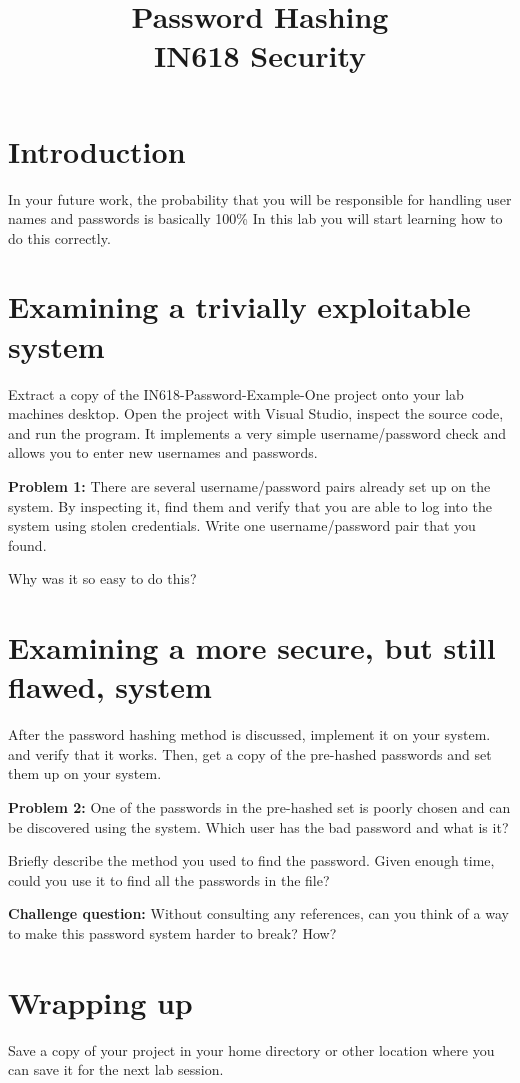 \documentclass{article}
\begin{document}
\title{Password Hashing\\ IN618 Security}
\date{}
\maketitle

\section*{Introduction}
In your future work, the probability that you will be responsible for handling user names and passwords is basically 100\%
In this lab you will start learning how to do this correctly.

\section{Examining a trivially exploitable system}
Extract a copy of the IN618-Password-Example-One project onto your lab machines desktop.  Open the project 
with Visual Studio, inspect the source code, and run the program.  It implements a very simple username/password 
check and allows you to enter new usernames and passwords.

\textbf{Problem 1:} There are several username/password pairs already set up on the system.  By inspecting it,
find them and verify that you are able to log into the system using stolen credentials.  Write one username/password
pair that you found.

\vspace{25mm}

Why was it so easy to do this?

\newpage      

\section{Examining a more secure, but still flawed, system}
After the password hashing method is discussed, implement it on your system. and verify that it works.  Then, get a copy 
of the pre-hashed passwords and set them up on your system.

\textbf{Problem 2:} One of the passwords in the pre-hashed set is poorly chosen and can be discovered using the system.
Which user has the bad password and what is it?

\vspace{25mm}

Briefly describe the method you used to find the password.  Given enough time, could you use it to find all 
the passwords in the file?  

\vspace{200mm}

\textbf{Challenge question:} Without consulting any references, can you think of a way to make this 
password system harder to break? How?


\vspace{50mm}

\section{Wrapping up}
Save a copy of your project in your home directory or other location where you can save it for the next lab session.
\end{document}
